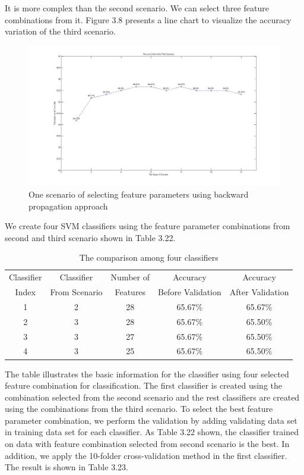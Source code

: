 It is more complex than the second scenario. We can select three feature combinations from it. Figure 3.8 presents a line chart to visualize the accuracy variation of the third scenario.
\begin{figure}
\includegraphics[width=\linewidth]{fig3_8c}
\caption{One scenario of selecting feature parameters using backward propagation approach}
\end{figure}
We create four SVM classifiers using the feature parameter combinations from second and third scenario shown in Table 3.22. 
\begin{table}[!h]
\begin{center}
\renewcommand{\arraystretch}{0.8}
\begin{tabular}{|| c | c | c | c | c ||}
\hline
 Classifier & Classifier & Number of & Accuracy & Accuracy \\
 Index & From Scenario &  Features & Before Validation & After Validation \\
\hline
 1 & 2 &28 & 65.67\% & 65.67\% \\
 2 & 3 &28 & 65.67\% & 65.50\% \\
 3 & 3 &27 & 65.67\% & 65.50\% \\
 4 & 3 &25 & 65.67\% & 65.50\% \\
\hline 
\end{tabular}
\end{center}
\caption{The comparison among four classifiers}
\end{table}
The table illustrates the basic information for the classifier using four selected feature combination for classification. The first classifier is created using the combination selected from the second scenario and the rest classifiers are created using the combinations from the third scenario. To select the best feature parameter combination, we perform the validation by adding validating data set in training data set for each classifier. As Table 3.22 shown, the classifier trained on data with feature combination selected from second scenario is the best. In addition, we apply the 10-folder cross-validation method in the first classifier. The result is shown in Table 3.23. 
